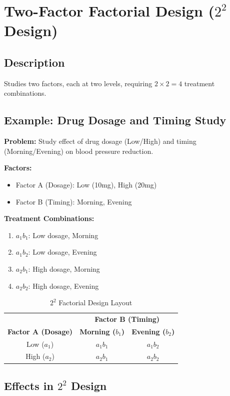 \documentclass[twoside]{book}
\begin{document}
\section{Two-Factor Factorial Design ($2^2$ Design)}

\subsection{Description}

Studies two factors, each at two levels, requiring $2 \times 2 = 4$ treatment combinations.

\subsection{Example: Drug Dosage and Timing Study}

\textbf{Problem:} Study effect of drug dosage (Low/High) and timing (Morning/Evening) on blood pressure reduction.

\textbf{Factors:}
\begin{itemize}
    \item Factor A (Dosage): Low (10mg), High (20mg)
    \item Factor B (Timing): Morning, Evening
\end{itemize}

\textbf{Treatment Combinations:}
\begin{enumerate}
    \item $a_1b_1$: Low dosage, Morning
    \item $a_1b_2$: Low dosage, Evening
    \item $a_2b_1$: High dosage, Morning
    \item $a_2b_2$: High dosage, Evening
\end{enumerate}

\begin{table}[h]
\centering
\caption{$2^2$ Factorial Design Layout}
\begin{tabular}{|c|c|c|}
\hline
& \multicolumn{2}{c|}{\textbf{Factor B (Timing)}} \\
\textbf{Factor A (Dosage)} & \textbf{Morning ($b_1$)} & \textbf{Evening ($b_2$)} \\
\hline
Low ($a_1$) & $a_1b_1$ & $a_1b_2$ \\
High ($a_2$) & $a_2b_1$ & $a_2b_2$ \\
\hline
\end{tabular}
\end{table}

\subsection{Effects in $2^2$ Design}
\end{document}
